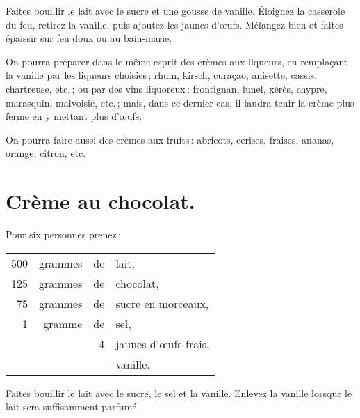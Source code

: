 Faites bouillir le lait avec le sucre et une gousse de vanille. Éloignez la
casserole du feu, retirez la vanille, puis ajoutez les jaunes d'œufs. Mélangez
bien et faites épaissir sur feu doux ou au bain-marie.

\sk

On pourra préparer dans le même esprit des crèmes aux liqueurs, en remplaçant
la vanille par les liqueurs choisies ; rhum, kirsch, curaçao, anisette, cassis,
chartreuse, etc. ; ou par des vins liquoreux : frontignan, lunel, xérès,
chypre, marasquin, malvoisie, etc. ; mais, dans ce dernier cas, il faudra tenir
la crème plus ferme en y mettant plus d'œufs.

\sk

On pourra faire aussi des crèmes aux fruits : abricots, cerises, fraises,
ananas, orange, citron, etc.

\label{pg0857} \hypertarget{p0857}{}
\section*{\centering Crème au chocolat.}
{}

Pour six personnes prenez :

\footnotesize
\begin{longtable}{rrrp{16em}}
    500 & grammes & de & lait,                                                                            \\
    125 & grammes & de & chocolat,                                                                        \\
     75 & grammes & de & sucre en morceaux,                                                               \\
      1 & gramme  & de & sel,                                                                             \\
        &         &  4 & jaunes d'œufs frais,                                                             \\
        &         &    & vanille.                                                                         \\
\end{longtable}
\normalsize

Faites bouillir le lait avec le sucre, le sel et la vanille. Enlevez la vanille
lorsque le lait sera suffisamment parfumé.

